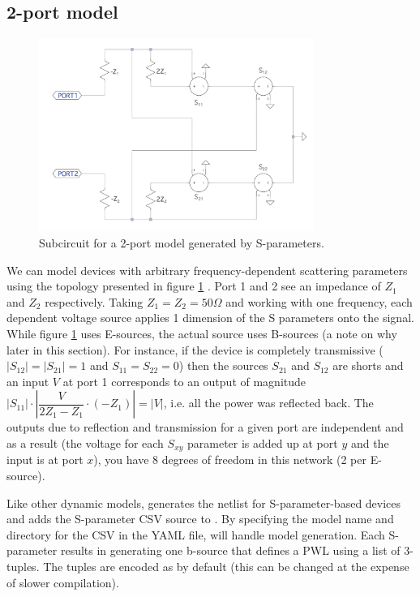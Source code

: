 \subsection{2-port model}

\begin{figure}
    \centering
    \includegraphics[width=0.8\textwidth]{figs/2port.png}
    \caption{Subcircuit for a 2-port model generated by S-parameters.}
    \label{fig:2port}
\end{figure}

We can model devices with arbitrary frequency-dependent scattering parameters 
using the topology presented in figure \ref{fig:2port} \cite{microsim}. Port 1 and 2 see
an impedance of $Z_1$ and $Z_2$ respectively. Taking $Z_1=Z_2=50\Omega$ and
working with one frequency, each dependent voltage source applies 1 dimension
of the S parameters onto the signal. While figure \ref{fig:2port} uses E-sources,
the actual source uses B-sources (a note on why later in this section).
For instance, if the device is completely
transmissive ($|S_{12}|=|S_{21}|=1$ and $S_{11}=S_{22}=0$) then the sources $S_{21}$
and $S_{12}$ are shorts and an input $V$ at port 1 corresponds to an output of 
magnitude $|S_{11}|\cdot \left|\dfrac{V}{2Z_1-Z_1}\cdot (-Z_1)\right|=|V|$, i.e.
all the power was reflected back. The outputs due to reflection and transmission 
for a given port are independent and as a result (the voltage for each $S_{xy}$ parameter is
added up at port $y$ and the input is at port $x$), you have 8 degrees of freedom in this
network (2 per E-source).

Like other dynamic models,  generates the netlist for S-parameter-based
devices and adds the S-parameter CSV source to . By specifying
the model name and directory for the CSV in the YAML file,  will handle model 
generation. Each S-parameter results in generating one b-source that defines a PWL using
a list of 3-tuples. The tuples are encoded as  by default (this 
can be changed at the expense of slower compilation).


